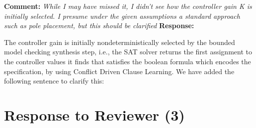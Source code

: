 \documentclass{article}
\begin{document}
\vspace{2em}

{\bf Comment: }
{\itshape While I may have missed it, I didn't see how the controller gain K is initially selected. I presume under the given assumptions a standard approach
such as pole placement, but this should be clarified}
\vspace{1em}
{\bf Response: }

The controller gain is initially nondeterministically selected by the bounded model checking synthesis step, i.e., the SAT solver returns the first assignment to the controller
values it finds
that satisfies the boolean formula which encodes the specification, by using Conflict Driven Clause Learning.
We have added the following sentence to clarify this:

\vspace{2em}

\section{Response to Reviewer (3)}
\end{document}

